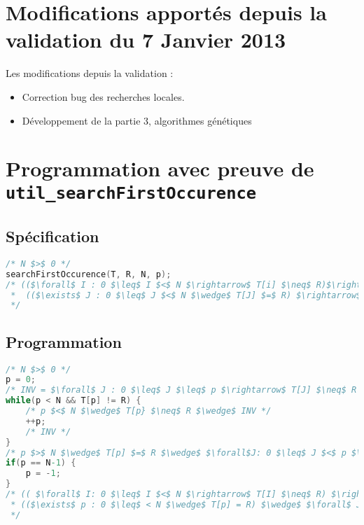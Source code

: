 \documentclass[a4paper, 11pt]{article}
\begin{document}
	\section{Modifications apportés depuis la validation du 7 Janvier 2013}
	Les modifications depuis la validation : 
	\begin{itemize}
		\item Correction bug des recherches locales.
		\item Développement de la partie 3, algorithmes génétiques
	\end{itemize}

	\section{Programmation avec preuve de \texttt{util\_searchFirstOccurence}}
	\subsection{Spécification}
\begin{lstlisting}[language=C]
/* N $>$ 0 */
searchFirstOccurence(T, R, N, p);
/* (($\forall$ I : 0 $\leq$ I $<$ N $\rightarrow$ T[i] $\neq$ R)$\rightarrow$ p $=$ -1) $\lor$ 
 *  (($\exists$ J : 0 $\leq$ J $<$ N $\wedge$ T[J] $=$ R) $\rightarrow$ p $=$ J) 
 */
\end{lstlisting}
\subsection{Programmation}
\begin{lstlisting}[language=C]
/* N $>$ 0 */
p = 0;
/* INV = $\forall$ J : 0 $\leq$ J $\leq$ p $\rightarrow$ T[J] $\neq$ R */
while(p < N && T[p] != R) {
	/* p $<$ N $\wedge$ T[p} $\neq$ R $\wedge$ INV */
	++p;
	/* INV */
}
/* p $>$ N $\wedge$ T[p] $=$ R $\wedge$ $\forall$J: 0 $\leq$ J $<$ p $\rightarrow$ T[J] $\neq$ R */
if(p == N-1) {
	p = -1;
}
/* (( $\forall$ I: 0 $\leq$ I $<$ N $\rightarrow$ T[I] $\neq$ R) $\rightarrow$ p = -1) $\wedge$
 * (($\exists$ p : 0 $\leq$ < N $\wedge$ T[p] = R) $\wedge$ $\forall$ J : 0 $\leq$ J < p $\rightarrow$ T[J] $\neq$ R)
 */
\end{lstlisting}
\end{document}
